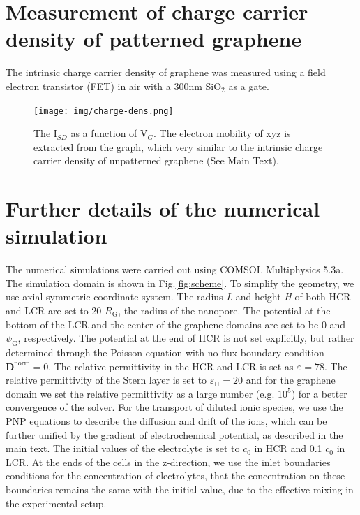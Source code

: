 \documentclass[manuscript=suppinfo,email=true, hyperref=true, keywords=false]{achemso}
\newcommand{\Fig}{Fig.}
\begin{document}
\section{Measurement of charge carrier density of patterned graphene}
\label{sec:charge-dens}
The intrinsic charge carrier density of graphene was measured using a 
field electron transistor (FET) in air with a 300nm SiO$_2$ as a gate. 

\begin{figure}[htbp]
  \centering
  \texttt{[image: img/charge-dens.png]}
  \caption{The I$_{SD}$ as a function of V$_G$. The electron mobility of xyz is extracted from the graph, which very similar to the 
  intrinsic charge carrier density of unpatterned graphene (See Main Text).}
  \label{fig:charge-dens}
\end{figure}

\section{Further details of the numerical simulation }
\label{sec:numer}

The numerical simulations were carried out using COMSOL Multiphysics
5.3a. The simulation domain is shown in \Fig \ref{fig:scheme}. To
simplify the geometry, we use axial symmetric coordinate system. The
radius \textit{L} and height \textit{H} of both HCR and LCR are set to
20 $R_{\mathrm{G}}$, the radius of the nanopore. The potential at the
bottom of the LCR and the center of the graphene domains are set to be
0 and $\psi_{\mathrm{G}}$, respectively. The potential at the end of
HCR is not set explicitly, but rather determined through the Poisson
equation with no flux boundary condition
$\boldsymbol{D}^{\mathrm{norm}}=0$. The relative permittivity in the
HCR and LCR is set as $\varepsilon_{\mathrm{}}=78$. The relative
permittivity of the Stern layer is set to
$\varepsilon_{\mathrm{H}}=20$\cite{Conway_1951} and for the graphene
domain we set the relative permittivity as a large number
(e.g. $10^{5}$) for a better convergence of the solver.  For the
transport of diluted ionic species, we use the PNP equations to
describe the diffusion and drift of the ions, which can be further
unified by the gradient of electrochemical potential, as described in
the main text. The initial values of the electrolyte is set to $c_{0}$
in HCR and 0.1 $c_{0}$ in LCR. At the ends of the cells in the
z-direction, we use the inlet boundaries conditions for the
concentration of electrolytes, that the concentration on these
boundaries remains the same with the initial value, due to the
effective mixing in the experimental setup.
\end{document}
